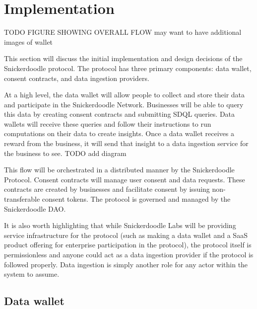 \section{Implementation}
\label{section:Implementation}
TODO FIGURE SHOWING OVERALL FLOW
        may want to have additional images of wallet



This section will discuss the initial implementation and design decisions of the Snickerdoodle protocol. The protocol has three primary components: data wallet, consent contracts, and data ingestion providers.

At a high level, the data wallet will allow people to collect and store their data and participate in the Snickerdoodle Network. Businesses will be able to query this data by creating consent contracts and submitting SDQL queries. Data wallets will receive these queries and follow their instructions to run computations on their data to create insights. Once a data wallet receives a reward from the business, it will send that insight to a data ingestion service for the business to see. TODO add diagram

This flow will be orchestrated in a distributed manner by the Snickerdoodle Protocol. Consent contracts will manage user consent and data requests. These contracts are created by businesses and facilitate consent by issuing non-transferable consent tokens. The protocol is governed and managed by the Snickerdoodle DAO. 

It is also worth highlighting that while Snickerdoodle Labs will be providing service infrastructure for the protocol (such as making a data wallet and a SaaS product offering for enterprise participation in the protocol), the protocol itself is permissionless and anyone could act as a data ingestion provider if the protocol is followed properly. Data ingestion is simply another role for any actor within the system to assume.

\subsection{Data wallet}
\label{section:DataWallet}
%



